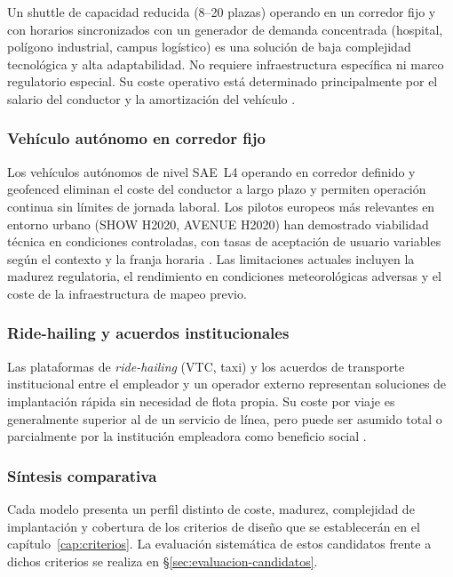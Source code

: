 Un shuttle de capacidad reducida (8--20 plazas) operando
en un corredor fijo y con horarios sincronizados con
un generador de demanda concentrada (hospital, polígono
industrial, campus logístico) es una solución de baja
complejidad tecnológica y alta adaptabilidad. No requiere
infraestructura específica ni marco regulatorio especial.
Su coste operativo está determinado principalmente por
el salario del conductor y la amortización del vehículo
\parencite{Stagecoach2020Hull}.

\subsubsection{Vehículo autónomo en corredor fijo}
\label{sec:sol-av}

Los vehículos autónomos de nivel SAE~L4 operando en
corredor definido y geofenced eliminan el coste del
conductor a largo plazo y permiten operación continua
sin límites de jornada laboral. Los pilotos europeos
más relevantes en entorno urbano (SHOW H2020, AVENUE H2020)
han demostrado viabilidad técnica en condiciones
controladas, con tasas de aceptación de usuario variables
según el contexto y la franja horaria
\parencite{SHOW2024Legacy}.
Las limitaciones actuales incluyen la madurez regulatoria,
el rendimiento en condiciones meteorológicas adversas
y el coste de la infraestructura de mapeo previo.

\subsubsection{Ride-hailing y acuerdos institucionales}
\label{sec:sol-ridehailing}

Las plataformas de \emph{ride-hailing} (VTC, taxi) y los
acuerdos de transporte institucional entre el empleador
y un operador externo representan soluciones de implantación
rápida sin necesidad de flota propia. Su coste por viaje
es generalmente superior al de un servicio de línea, pero
puede ser asumido total o parcialmente por la institución
empleadora como beneficio social \parencite{Stagecoach2020Hull, K2Centrum2025DRT}.

\subsubsection{Síntesis comparativa}
\label{sec:sol-sintesis}

Cada modelo presenta un perfil distinto de coste, madurez,
complejidad de implantación y cobertura de los criterios
de diseño que se establecerán en el capítulo~\ref{cap:criterios}.
La evaluación sistemática de estos candidatos frente a
dichos criterios se realiza en §\ref{sec:evaluacion-candidatos}.



